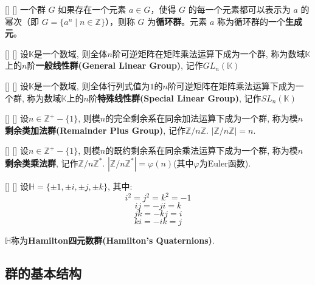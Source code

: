 \documentclass[UTF8]{ctexart}
\begin{document}
		\begin{xmp}
            []
            {}
            []
            []
			一个群 \( G \) 如果存在一个元素 \( a \in G \)，使得 \( G \) 的每一个元素都可以表示为 \( a \) 的幂次（即 \( G = \{a^n \mid n \in \mathbb{Z}\} \)），则称 \( G \) 为\textbf{循环群}。元素 \( a \) 称为循环群的一个\textbf{生成元}。
		\end{xmp}
		
		\begin{xmp}
            []
            {}
            []
            []
			设$\mathbb{K}$是一个数域, 则全体$n$阶可逆矩阵在矩阵乘法运算下成为一个群, 称为数域$\mathbb{K}$上的$n$阶\textbf{一般线性群(General Linear Group)}, 记作$GL_{n}(\mathbb{K})$
		\end{xmp}
		
		\begin{xmp}
            []
            {}
            []
            []
			设$\mathbb{K}$是一个数域, 则全体行列式值为$1$的$n$阶可逆矩阵在矩阵乘法运算下成为一个群, 称为数域$\mathbb{K}$上的$n$阶\textbf{特殊线性群(Special Linear Group)}, 记作$SL_{n}(\mathbb{K})$
		\end{xmp}
		
		\begin{xmp}
            []
            {}
            []
            []
			设$n\in \mathbb{Z}^{+}-\{1\}$, 则模$n$的完全剩余系在同余加法运算下成为一个群, 称为模$n$\textbf{剩余类加法群(Remainder Plus Group)}, 记作$\mathbb{Z}/n\mathbb{Z}$. $|\mathbb{Z}/n\mathbb{Z}|=n$.
		\end{xmp}
		
		\begin{xmp}
            []
            {}
            []
            []
			设$n\in \mathbb{Z}^{+}-\{1\}$, 则模$n$的既约剩余系在同余乘法运算下成为一个群, 称为模$n$\textbf{剩余类乘法群}, 记作$\mathbb{Z}/n\mathbb{Z}^{*}$. $|\mathbb{Z}/n\mathbb{Z}^{*}|=\varphi (n)$(其中$\varphi$为Euler函数). 
		\end{xmp}
		
		\begin{xmp}
            []
            {}
            []
            []
			设$\mathbb{H}=\{\pm 1,\pm i,\pm j,\pm k\}$, 其中: 
			\[i^{2}=j^{2}=k^{2}=-1\]
			\[ij=-ji=k\]
			\[jk=-kj=i\]
			\[ki=-ik=j\]
			
			$\mathbb{H}$称为\textbf{Hamilton四元数群(Hamilton's Quaternions)}. 
		\end{xmp}
	
	\subsection{群的基本结构}
		
\end{document}
